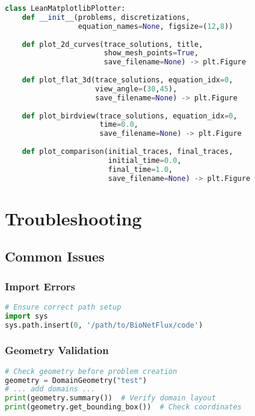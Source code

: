 \documentclass[11pt,a4paper]{article}
\begin{document}
\begin{lstlisting}[language=Python, caption={Plotter API}]
class LeanMatplotlibPlotter:
    def __init__(problems, discretizations, 
                 equation_names=None, figsize=(12,8))
    
    def plot_2d_curves(trace_solutions, title, 
                       show_mesh_points=True,
                       save_filename=None) -> plt.Figure
    
    def plot_flat_3d(trace_solutions, equation_idx=0, 
                     view_angle=(30,45),
                     save_filename=None) -> plt.Figure
    
    def plot_birdview(trace_solutions, equation_idx=0, 
                      time=0.0,
                      save_filename=None) -> plt.Figure
    
    def plot_comparison(initial_traces, final_traces, 
                        initial_time=0.0,
                        final_time=1.0, 
                        save_filename=None) -> plt.Figure
\end{lstlisting}






\section{Troubleshooting}

\subsection{Common Issues}

\subsubsection{Import Errors}
\begin{lstlisting}[language=Python, caption={Path Setup}]
# Ensure correct path setup
import sys
sys.path.insert(0, '/path/to/BioNetFlux/code')
\end{lstlisting}

\subsubsection{Geometry Validation}
\begin{lstlisting}[language=Python, caption={Geometry Debugging}]
# Check geometry before problem creation
geometry = DomainGeometry("test")
# ... add domains ...
print(geometry.summary())  # Verify domain layout
print(geometry.get_bounding_box())  # Check coordinates
\end{lstlisting}
\end{document}
